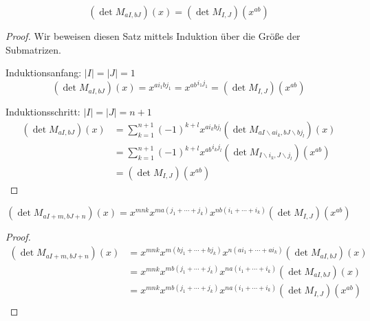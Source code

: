 \begin{satz}
    \begin{equation*}
        \left( \det{} M_{aI,bJ} \right) (x) = \left( \det{} M_{I,J} \right) (x^{ab})
    \end{equation*}
\end{satz}

\begin{proof}
    Wir beweisen diesen Satz mittels Induktion über die Größe der Submatrizen. 

    Induktionsanfang: $|I| = |J| = 1$
    \begin{equation*}
        \left( \det{} M_{aI,bJ} \right) (x) = x^{ai_1bj_1} = {x^{ab}}^{i_1j_1} = \left( \det{} M_{I,J} \right) (x^{ab})
    \end{equation*}

    Induktionsschritt: $|I| = |J| = n+1$
    \begin{align*}
        \left( \det{} M_{aI,bJ} \right) (x) &= \sum_{k=1}^{n+1} (-1)^{k+l} x^{ai_kbj_l} \left( \det M_{aI\backslash ai_k, bJ \backslash bj_l} \right) (x) \\
                                            &= \sum_{k=1}^{n+1} (-1)^{k+l} {x^{ab}}^{i_kj_l} \left( \det M_{I\backslash i_k, J \backslash j_l} \right) (x^{ab}) \\
                                            &= \left( \det{} M_{I,J} \right) (x^{ab})
    \end{align*}
\end{proof}


\begin{korollar}
    \begin{equation*}
        \left( \det{} M_{aI + m,bJ + n} \right) (x) = x^{mnk} x^{ma(j_1 +\cdots + j_k)} x^{nb(i_1+\cdots +i_k)} \left( \det{} M_{I,J} \right) (x^{ab})
    \end{equation*}
\end{korollar}

\begin{proof}
    \begin{align*}
        \left( \det{} M_{aI + m,bJ + n} \right) (x) &= x^{mnk} x^{m(bj_1 +\cdots + bj_k)} x^{n(ai_1+\cdots +ai_k)} \left( \det{} M_{aI,bJ} \right) (x) \\
                                                    &= x^{mnk} x^{mb(j_1 +\cdots + j_k)} x^{na(i_1+\cdots +i_k)} \left( \det{} M_{aI,bJ} \right) (x) \\
                                                    &= x^{mnk} x^{mb(j_1 +\cdots + j_k)} x^{na(i_1+\cdots +i_k)} \left( \det{} M_{I,J} \right) (x^{ab}) \\
    \end{align*}
\end{proof}